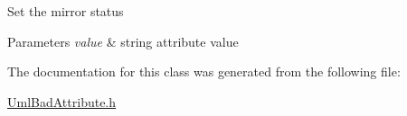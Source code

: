 Set the mirror status 
\begin{DoxyParams}{Parameters}
{\em value} & string attribute value \\
\hline
\end{DoxyParams}


The documentation for this class was generated from the following file\+:\begin{DoxyCompactItemize}
\item 
\mbox{\hyperlink{_uml_bad_attribute_8h}{Uml\+Bad\+Attribute.\+h}}\end{DoxyCompactItemize}
